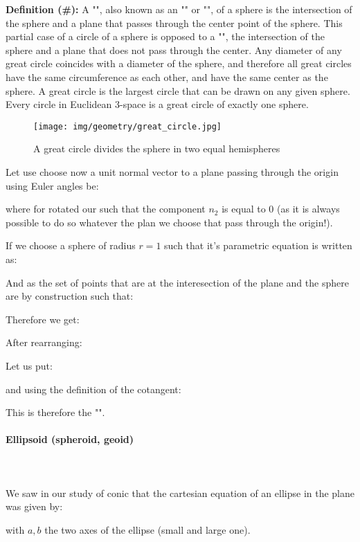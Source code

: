{	\textbf{Definition (\#\mydef):}  A "", also known as an "" or "", of a sphere is the intersection of the sphere and a plane that passes through the center point of the sphere. This partial case of a circle of a sphere is opposed to a "", the intersection of the sphere and a plane that does not pass through the center. Any diameter of any great circle coincides with a diameter of the sphere, and therefore all great circles have the same circumference as each other, and have the same center as the sphere. A great circle is the largest circle that can be drawn on any given sphere. Every circle in Euclidean 3-space is a great circle of exactly one sphere.
	\begin{figure}[H]
		\centering
		\texttt{[image: img/geometry/great\_circle.jpg]}
		\caption{A great circle divides the sphere in two equal hemispheres}
	\end{figure}
	Let use choose now a unit normal vector to a plane passing through the origin using Euler angles be:
	
	where for rotated our such that the component $n_2$ is equal to $0$ (as it is always possible to do so whatever the plan we choose that pass through the origin!).
	
	If we choose a sphere of radius $r=1$ such that it's parametric equation is written as:
	
	And as the set of points that are at the interesection of the plane and the sphere are by construction such that:
	
	Therefore we get:
	
	After rearranging:
	
	Let us put:
	
	and using the definition of the cotangent:
	
	This is therefore the "".
	
	\pagebreak
	\paragraph{Ellipsoid (spheroid, geoid)}\mbox{}\\\\
	We saw in our study of conic that the cartesian equation of an ellipse in the plane was given by:
	
	with $a, b$ the two axes of the ellipse (small and large one).
	
}
